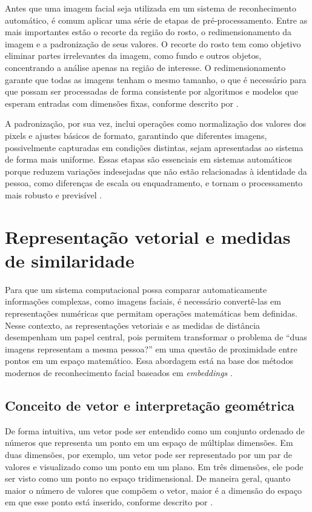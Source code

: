 Antes que uma imagem facial seja utilizada em um sistema de reconhecimento automático, é comum aplicar uma série de etapas de pré-processamento. Entre as mais importantes estão o recorte da região do rosto, o redimensionamento da imagem e a padronização de seus valores. O recorte do rosto tem como objetivo eliminar partes irrelevantes da imagem, como fundo e outros objetos, concentrando a análise apenas na região de interesse. O redimensionamento garante que todas as imagens tenham o mesmo tamanho, o que é necessário para que possam ser processadas de forma consistente por algoritmos e modelos que esperam entradas com dimensões fixas, conforme descrito por \textcite{zhao2003face}.

A padronização, por sua vez, inclui operações como normalização dos valores dos pixels e ajustes básicos de formato, garantindo que diferentes imagens, possivelmente capturadas em condições distintas, sejam apresentadas ao sistema de forma mais uniforme. Essas etapas são essenciais em sistemas automáticos porque reduzem variações indesejadas que não estão relacionadas à identidade da pessoa, como diferenças de escala ou enquadramento, e tornam o processamento mais robusto e previsível \cite{zhao2003face}.


\section{Representação vetorial e medidas de similaridade}

Para que um sistema computacional possa comparar automaticamente informações complexas, como imagens faciais, é necessário convertê-las em representações numéricas que permitam operações matemáticas bem definidas. Nesse contexto, as representações vetoriais e as medidas de distância desempenham um papel central, pois permitem transformar o problema de “duas imagens representam a mesma pessoa?” em uma questão de proximidade entre pontos em um espaço matemático. Essa abordagem está na base dos métodos modernos de reconhecimento facial baseados em \textit{embeddings} \cite{theodoridis2009pattern}.

\subsection{Conceito de vetor e interpretação geométrica}

De forma intuitiva, um vetor pode ser entendido como um conjunto ordenado de números que representa um ponto em um espaço de múltiplas dimensões. Em duas dimensões, por exemplo, um vetor pode ser representado por um par de valores e visualizado como um ponto em um plano. Em três dimensões, ele pode ser visto como um ponto no espaço tridimensional. De maneira geral, quanto maior o número de valores que compõem o vetor, maior é a dimensão do espaço em que esse ponto está inserido, conforme descrito por \textcite{bishop2006prml}.


